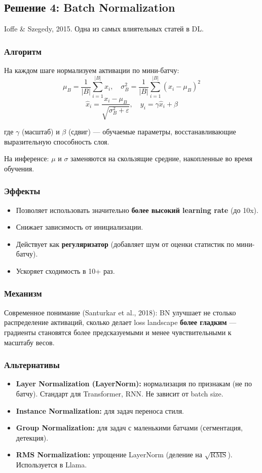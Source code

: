 \documentclass[a4paper,12pt]{article}
\begin{document}
\subsection{Решение 4: Batch Normalization}

Ioffe \& Szegedy, 2015. Одна из самых влиятельных статей в DL.

\subsubsection{Алгоритм}

На каждом шаге нормализуем активации по мини-батчу:
\[
\mu_B = \frac{1}{|B|} \sum_{i=1}^{|B|} x_i, \quad \sigma_B^2 = \frac{1}{|B|} \sum_{i=1}^{|B|} (x_i - \mu_B)^2
\]
\[
\hat{x}_i = \frac{x_i - \mu_B}{\sqrt{\sigma_B^2 + \varepsilon}}, \quad y_i = \gamma \hat{x}_i + \beta
\]

где $\gamma$ (масштаб) и $\beta$ (сдвиг) — обучаемые параметры, восстанавливающие выразительную способность слоя.

На инференсе: $\mu$ и $\sigma$ заменяются на скользящие средние, накопленные во время обучения.

\subsubsection{Эффекты}
\begin{itemize}
    \item Позволяет использовать значительно \textbf{более высокий learning rate} (до 10x).
    \item Снижает зависимость от инициализации.
    \item Действует как \textbf{регуляризатор} (добавляет шум от оценки статистик по мини-батчу).
    \item Ускоряет сходимость в 10+ раз.
\end{itemize}

\subsubsection{Механизм}
Современное понимание (Santurkar et al., 2018): BN улучшает не столько распределение активаций, сколько делает loss landscape \textbf{более гладким} — градиенты становятся более предсказуемыми и менее чувствительными к масштабу весов.

\subsubsection{Альтернативы}
\begin{itemize}
    \item \textbf{Layer Normalization (LayerNorm):} нормализация по признакам (не по батчу). Стандарт для Transformer, RNN. Не зависит от batch size.
    \item \textbf{Instance Normalization:} для задач переноса стиля.
    \item \textbf{Group Normalization:} для задач с маленькими батчами (сегментация, детекция).
    \item \textbf{RMS Normalization:} упрощение LayerNorm (деление на $\sqrt{\text{RMS}}$). Используется в Llama.
\end{itemize}
\end{document}
